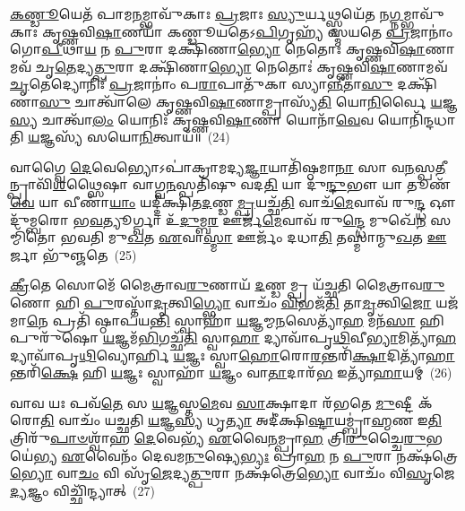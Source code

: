 \-\ul{𑌕}\-\-\ul{𑌣𑍍𑌡𑍂}\-𑌯𑍇𑌤᳴ 𑌪𑌾𑌮\-\ul{𑌨}\-𑌮𑍍𑌭𑌾𑌵𑍁᳴𑌕𑌾𑌃 \ul{𑌪𑍍𑌰}\-𑌜𑌾𑌃 \ul{𑌸𑍍𑌯𑍁}\-𑌰𑍍𑌯𑌥𑍍𑌸𑍍𑌮𑌯𑍇᳴𑌤 𑌨\-\ul{𑌗𑍍𑌨}\-𑌮𑍍𑌭𑌾𑌵𑍁᳴𑌕𑌾𑌃 𑌕𑍃𑌷𑍍𑌣𑌵𑌿\-\ul{𑌷𑌾}\-𑌣𑌯𑌾᳴ 𑌕𑌣𑍍𑌡𑍂𑌯𑌤𑍇\-𑌽\-\ul{𑌪𑌿}\-𑌗𑍃𑌹𑍍𑌯᳴ 𑌸𑍍𑌮𑌯𑌤𑍇 \ul{𑌪𑍍𑌰}\-𑌜𑌾𑌨𑌾𑌂॑ 𑌗𑍋\-\ul{𑌪𑍀}\-𑌥𑌾\-\ul{𑌯} 𑌨 \ul{𑌪𑍁}\-𑌰𑌾 𑌦𑌕𑍍𑌷𑌿᳴𑌣𑌾\-\ul{𑌭𑍍𑌯𑍋} 𑌨𑍇𑌤𑍋𑌃॑ 𑌕𑍃𑌷𑍍𑌣𑌵𑌿\-\ul{𑌷𑌾}\-𑌣𑌾𑌮𑌵᳴ 𑌚𑍃\-\ul{𑌤𑍇}\-𑌦𑍍𑌯\-\ul{𑌤𑍍𑌪𑍁}\-𑌰𑌾 𑌦𑌕𑍍𑌷𑌿᳴𑌣𑌾\-\ul{𑌭𑍍𑌯𑍋} 𑌨𑍇𑌤𑍋𑌃॑ 𑌕𑍃𑌷𑍍𑌣𑌵𑌿\-\ul{𑌷𑌾}\-𑌣𑌾𑌮𑌵᳴\-\ul{𑌚𑍃}\-𑌤𑍇𑌦𑍍𑌯𑍋𑌨𑌿𑌃᳴ \ul{𑌪𑍍𑌰}\-𑌜𑌾𑌨𑌾𑌂॑ 𑌪\-\ul{𑌰𑌾}\-𑌪𑌾𑌤𑍁᳴𑌕𑌾 𑌸𑍍𑌯𑌾\-\ul{𑌨𑍍𑌨𑍀}\-𑌤𑌾\-\ul{𑌸𑍁} 𑌦𑌕𑍍𑌷𑌿᳴𑌣𑌾\-\ul{𑌸𑍁} 𑌚𑌾𑌤𑍍𑌵𑌾᳴𑌲𑍇 𑌕𑍃𑌷𑍍𑌣𑌵𑌿\-\ul{𑌷𑌾}\-𑌣𑌾𑌮𑍍𑌪𑍍𑌰𑌾𑌸𑍍𑌯᳴\-\ul{𑌤𑌿} 𑌯𑍋\-\ul{𑌨𑌿}\-𑌰𑍍𑌵𑍈 \ul{𑌯}\-𑌜𑍍𑌞\-\ul{𑌸𑍍𑌯} 𑌚𑌾𑌤𑍍𑌵𑌾᳴\-\ul{𑌲𑌂} 𑌯𑍋𑌨𑌿𑌃᳴ 𑌕𑍃𑌷𑍍𑌣𑌵𑌿\-\ul{𑌷𑌾}\-𑌣𑌾 𑌯𑍋𑌨𑌾᳴\-\ul{𑌵𑍇}\-𑌵 𑌯𑍋𑌨𑌿᳴𑌨𑍍𑌦𑌧𑌾𑌤𑌿 \ul{𑌯}\-𑌜𑍍𑌞𑌸𑍍𑌯᳴ 𑌸𑌯𑍋\-\ul{𑌨𑌿}\-𑌤𑍍𑌵𑌾𑌯᳴॥~(24)

{\anuvakamend[{\-\ul{𑌰𑍁}\-\-\ul{𑌨𑍍𑌧} \ul{𑌏}\-𑌷 𑌤𑌸𑍍𑌮𑌾॑𑌚𑍍𑌛\-\ul{𑌰}\-𑌮\-\ul{𑌯𑍀} 𑌯𑍂\-\ul{𑌪}\-𑌸𑍍𑌤𑍃𑌤𑍀᳴𑌯𑌮𑍍𑌮𑌿𑌥𑍁\-\ul{𑌨}\-𑌤𑍍𑌵𑌾\-\ul{𑌯} 𑌜\-\ul{𑌨𑍍𑌮} 𑌹𑌸𑍍𑌤𑍇᳴\-\ul{𑌨𑌾}\-𑌷𑍍𑌟𑌾𑌚᳴𑌤𑍍𑌵𑌾𑌰𑌿𑍞𑌶𑌚𑍍𑌚}]}%

𑌵𑌾𑌗𑍍𑌵𑍈 \ul{𑌦𑍇}\-𑌵𑍇𑌭𑍍𑌯𑍋\-𑌽𑌪𑌾॑𑌕𑍍𑌰𑌾𑌮𑌦𑍍𑌯\-\ul{𑌜𑍍𑌞𑌾}\-𑌯𑌾𑌤𑌿᳴𑌷𑍍𑌠𑌮𑌾\-\ul{𑌨𑌾} 𑌸𑌾 𑌵\-\ul{𑌨}\-𑌸𑍍𑌪\-\ul{𑌤𑍀}\-𑌨𑍍𑌪𑍍𑌰𑌾𑌵𑌿᳴\-\ul{𑌶}\-𑌥𑍍𑌸𑍈𑌷𑌾 𑌵𑌾𑌗𑍍𑌵\-\ul{𑌨}\-𑌸𑍍𑌪𑌤𑌿᳴𑌷𑍁 𑌵𑌦\-\ul{𑌤𑌿} 𑌯𑌾 𑌦𑍁᳴\-\ul{𑌨𑍍𑌦𑍁}\-𑌭𑍗 𑌯𑌾 𑌤𑍂𑌣᳴\-\ul{𑌵𑍇} 𑌯𑌾 𑌵𑍀𑌣𑌾᳴\-\ul{𑌯𑌾𑌂} 𑌯𑌦𑍍𑌦𑍀॑𑌕𑍍𑌷𑌿𑌤\-\ul{𑌦}\-𑌣𑍍𑌡\-\ul{𑌮𑍍𑌪𑍍𑌰}\-𑌯𑌚𑍍𑌛᳴\-\ul{𑌤𑌿} 𑌵𑌾𑌚᳴\-\ul{𑌮𑍇}\-𑌵𑌾𑌵᳴ 𑌰𑍁\-\ul{𑌨𑍍𑌦𑍍𑌧} 𑌔𑌦𑍁᳴𑌮𑍍𑌬𑌰𑍋 𑌭\-\ul{𑌵}\-𑌤𑍍𑌯𑍂𑌰𑍍𑌗𑍍𑌵𑌾 𑌉᳴\-\ul{𑌦𑍁}\-𑌮𑍍𑌬\-\ul{𑌰} 𑌊𑌰𑍍𑌜᳴\-\ul{𑌮𑍇}\-𑌵𑌾𑌵᳴ 𑌰𑍁\-\ul{𑌨𑍍𑌦𑍍𑌧𑍇} 𑌮𑍁𑌖𑍇᳴\-\ul{𑌨} 𑌸𑌮𑍍𑌮𑌿᳴𑌤𑍋 𑌭𑌵𑌤𑌿 𑌮𑍁\-\ul{𑌖}\-𑌤 \ul{𑌏}\-𑌵𑌾\-\ul{𑌸𑍍𑌮𑌾} 𑌊𑌰𑍍𑌜𑌂᳴ 𑌦𑌧𑌾\-\ul{𑌤𑌿} 𑌤𑌸𑍍𑌮𑌾॑𑌨𑍍𑌮𑍁\-\ul{𑌖}\-𑌤 \ul{𑌊}\-𑌰𑍍𑌜𑌾 𑌭𑍁᳴𑌞𑍍𑌜𑌤𑍇~(25)

\-\ul{𑌕𑍍𑌰𑍀}\-𑌤𑍇 𑌸𑍋𑌮𑍇᳴ 𑌮𑍈𑌤𑍍𑌰𑌾𑌵\-\ul{𑌰𑍁}\-𑌣𑌾𑌯᳴ \ul{𑌦}\-𑌣𑍍𑌡𑌮𑍍𑌪𑍍𑌰 𑌯᳴𑌚𑍍𑌛𑌤𑌿 𑌮𑍈𑌤𑍍𑌰𑌾𑌵\-\ul{𑌰𑍁}\-𑌣𑍋 𑌹𑌿 \ul{𑌪𑍁}\-𑌰𑌸𑍍𑌤𑌾᳴\-\ul{𑌦𑍃}\-𑌤𑍍𑌵𑌿\-\ul{𑌗𑍍𑌭𑍍𑌯𑍋} 𑌵𑌾𑌚𑌂᳴ \ul{𑌵𑌿}\-𑌭𑌜᳴\-\ul{𑌤𑌿} 𑌤𑌾\-\ul{𑌮𑍃}\-𑌤𑍍𑌵𑌿\-\ul{𑌜𑍋} 𑌯𑌜᳴𑌮𑌾\-\ul{𑌨𑍇} 𑌪𑍍𑌰𑌤𑌿᳴ 𑌷𑍍𑌠𑌾𑌪𑌯\-\ul{𑌨𑍍𑌤𑌿} 𑌸𑍍𑌵𑌾𑌹𑌾᳴ \ul{𑌯}\-𑌜𑍍𑌞𑌮𑍍𑌮\-\ul{𑌨}\-𑌸𑍇𑌤𑍍𑌯𑌾᳴\-\ul{𑌹} 𑌮𑌨᳴\-\ul{𑌸𑌾} 𑌹𑌿 𑌪𑍁𑌰𑍁᳴𑌷𑍋 \ul{𑌯}\-𑌜𑍍𑌞𑌮᳴\-\ul{𑌭𑌿}\-𑌗𑌚𑍍𑌛᳴\-\ul{𑌤𑌿} 𑌸𑍍𑌵𑌾\-\ul{𑌹𑌾} 𑌦𑍍𑌯𑌾𑌵𑌾᳴𑌪𑍃\-\ul{𑌥𑌿}\-𑌵𑍀\-\ul{𑌭𑍍𑌯𑌾}\-𑌮𑌿𑌤𑍍𑌯𑌾᳴\-\ul{𑌹} 𑌦𑍍𑌯𑌾𑌵𑌾᳴𑌪𑍃\-\ul{𑌥𑌿}\-𑌵𑍍𑌯𑍋𑌰𑍍\mbox{}𑌹𑌿 \ul{𑌯}\-𑌜𑍍𑌞𑌃 𑌸𑍍𑌵𑌾\-\ul{𑌹𑍋}\-𑌰𑍋\-\ul{𑌰}\-𑌨𑍍𑌤𑌰𑌿᳴\-\ul{𑌕𑍍𑌷𑌾}\-𑌦𑌿𑌤𑍍𑌯𑌾᳴\-\ul{𑌹𑌾}\-𑌨𑍍𑌤𑌰𑌿᳴\-\ul{𑌕𑍍𑌷𑍇} 𑌹𑌿 \ul{𑌯}\-𑌜𑍍𑌞𑌃 𑌸𑍍𑌵𑌾𑌹𑌾᳴ \ul{𑌯}\-𑌜𑍍𑌞𑌂 𑌵𑌾\-\ul{𑌤𑌾}\-𑌦𑌾𑌰᳴\-\ul{𑌭} 𑌇𑌤𑍍𑌯𑌾᳴\-\ul{𑌹𑌾}\-𑌯𑌮𑍍~(26)

𑌵𑌾𑌵 𑌯𑌃 𑌪𑌵᳴\-\ul{𑌤𑍇} 𑌸 \ul{𑌯}\-𑌜𑍍𑌞𑌸𑍍𑌤\-\ul{𑌮𑍇}\-𑌵 \ul{𑌸𑌾}\-𑌕𑍍𑌷𑌾𑌦𑌾 𑌰᳴𑌭𑌤𑍇 \ul{𑌮𑍁}\-𑌷𑍍𑌟𑍀 𑌕᳴𑌰𑍋\-\ul{𑌤𑌿} 𑌵𑌾𑌚𑌂᳴ 𑌯𑌚𑍍𑌛𑌤𑌿 \ul{𑌯}\-𑌜𑍍𑌞\-\ul{𑌸𑍍𑌯} 𑌧𑍃\-\ul{𑌤𑍍𑌯𑌾} 𑌅𑌦𑍀॑𑌕𑍍𑌷𑌿\-\ul{𑌷𑍍𑌟𑌾}\-𑌯𑌮𑍍𑌬𑍍𑌰𑌾॑\-\ul{𑌹𑍍𑌮}\-𑌣 𑌇\-\ul{𑌤𑌿} 𑌤𑍍𑌰𑌿𑌰𑍁᳴\-\ul{𑌪𑌾}\-\-\ul{𑍞}\-𑌶𑍍𑌵𑌾᳴𑌹 \ul{𑌦𑍇}\-𑌵𑍇𑌭𑍍𑌯᳴ \ul{𑌏}\-𑌵𑍈\-\ul{𑌨}\-𑌮𑍍𑌪𑍍𑌰𑌾\-\ul{𑌹} 𑌤𑍍𑌰𑌿\-\ul{𑌰𑍁}\-𑌚𑍍𑌚𑍈\-\ul{𑌰𑍁}\-𑌭𑌯𑍇॑𑌭𑍍𑌯 \ul{𑌏}\-𑌵𑍈𑌨𑌂᳴ 𑌦𑍇𑌵𑌮\-\ul{𑌨𑍁}\-𑌷𑍍𑌯𑍇\-\ul{𑌭𑍍𑌯𑌃} 𑌪𑍍𑌰𑌾\-\ul{𑌹} 𑌨 \ul{𑌪𑍁}\-𑌰𑌾 𑌨𑌕𑍍𑌷᳴𑌤𑍍𑌰𑍇\-\ul{𑌭𑍍𑌯𑍋} 𑌵𑌾\-\ul{𑌚𑌂} 𑌵𑌿 𑌸𑍃᳴\-\ul{𑌜𑍇}\-𑌦𑍍𑌯\-\ul{𑌤𑍍𑌪𑍁}\-𑌰𑌾 𑌨𑌕𑍍𑌷᳴𑌤𑍍𑌰𑍇\-\ul{𑌭𑍍𑌯𑍋} 𑌵𑌾𑌚𑌂᳴ 𑌵𑌿\-\ul{𑌸𑍃}\-𑌜𑍇\-\ul{𑌦𑍍𑌯}\-𑌜𑍍𑌞𑌂 𑌵𑌿𑌚𑍍𑌛𑌿᳴𑌨𑍍𑌦𑍍𑌯𑌾𑌤𑍍~(27)

